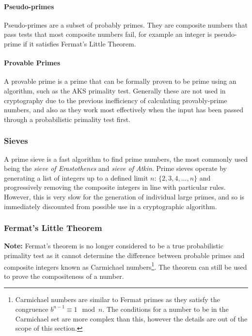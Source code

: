       \paragraph{Pseudo-primes}
      
      Pseudo-primes are a subset of probably primes. They are composite numbers that pass tests that most composite numbers fail, for example an integer is pseudo-prime if it satisfies Fermat's Little Theorem.
      
      \paragraph{Provable Primes}
      
      A provable prime is a prime that can be formally proven to be prime using an algorithm, such as the AKS primality test. Generally these are not used in cryptography due to the previous inefficiency of calculating provably-prime numbers, and also as they work most effectively when the input has been passed through a probabilistic primality test first.
  
    \subsubsection{Sieves}
    
    A prime sieve is a fast algorithm to find prime numbers, the most commonly used being the \emph{sieve of Erastothenes} and \emph{sieve of Atkin}. Prime sieves operate by generating a list of integers up to a defined limit $n$: $\{2,3,4,...,n\}$ and progressively removing the composite integers in line with particular rules. However, this is very slow for the generation of individual large primes, and so is immediately discounted from possible use in a cryptographic algorithm.
    
    \subsubsection{Fermat's Little Theorem}
    \label{subsubsec:fermat}
    
    \textbf{Note:} Fermat's theorem is no longer considered to be a true probabilistic primality test as it cannot determine the difference between probable primes and composite integers known as Carmichael numbers\footnote{Carmichael numbers are similar to Fermat primes as they satisfy the congruence $b^{n-1} \equiv 1 \mod{n}$. The conditions for a number to be in the Carmichael set are more complex than this, however the details are out of the scope of this section.}. The theorem can still be used to prove the compositeness of a number.
    
